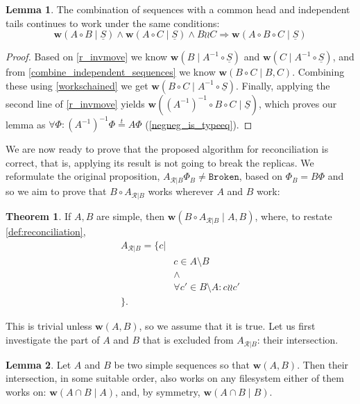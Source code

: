 \documentclass[12pt]{article}
\newcommand{\fsbroken}{\mathtt{Broken}} %
\newcommand{\FS}{\Phi} %
\newcommand{\cc}{\circ} %
\newcommand{\indep}{\mathrel{\wr\wr}} %
\newcommand{\workssign}{\mathbf{w}}
\newcommand{\works}[1]{\workssign({#1})}
\newcommand{\worksc}[2]{\workssign({#1}\mathrel{|}{#2})}
\newcommand{\typeeq}{\stackrel{t}{=}}
\newcommand{\seqset}[1]{\underline{#1}} %
\newcommand{\recchar}[3]{{#1}^{#3}_{\mathcal{R}|{#2}}}
\newcommand{\reca}{\recchar{A}{B}{}} %
\theoremstyle{definition}
\newtheorem{mydef}{Definition}
\newtheorem{mylem}{Lemma}
\newtheorem{myth}{Theorem}
\begin{document}
\begin{mylem}\label{indep_prefix_combine}
The combination of sequences with a common head and independent tails continues to work under the same conditions:
\[ \worksc{A\cc B}{\seqset{S}} \wedge \worksc{A\cc C}{\seqset{S}} \wedge B\indep C \Rightarrow \worksc{A\cc B\cc C}{\seqset{S}} \]
\end{mylem}
\begin{proof}
Based on \cref{r_invmove} we know
$\worksc{B}{A^{-1}\cc \seqset{S}}$ and $\worksc{C}{A^{-1}\cc \seqset{S}}$,
and from \cref{combine_independent_sequences} we know
$\worksc{B\cc C}{B,C}$.
Combining these using \cref{workschained}
we get
$\worksc{B\cc C}{A^{-1}\cc \seqset{S}}$. 
Finally, applying the second line of \cref{r_invmove} yields
$\worksc{(A^{-1})^{-1}\cc B\cc C}{\seqset{S}}$, which proves our lemma 
as $\forall\FS: (A^{-1})^{-1}\FS\typeeq A\FS$ (\cref{negneg_is_typeeq}).
\end{proof}


\medskip


We are now ready to prove that the proposed algorithm for reconciliation is correct,
that is, applying its result is not going to break the replicas.
We reformulate the original proposition, $\reca\FS_B\neq\fsbroken$,
based on $\FS_B=B\FS$ and so we aim to prove that
$B\cc\reca$ works wherever $A$ and $B$ work:

\begin{myth}
If $A, B$ are simple, then $\worksc{B\cc \reca}{A,B}$,
where, to restate \cref{def:reconciliation},
\begin{align*}
\reca = \{c| & \\
& c\in A\setminus B \\
& \wedge \\
& \forall c'\in B\setminus A: c\indep c'\\
\}. &
\end{align*}
\end{myth}

This is trivial unless $\works{A,B}$, so we assume that it is true.
Let us first investigate the part of $A$ and $B$ that is excluded from
$\reca$: their intersection.

\begin{mylem}\label{can_move_intersection}
Let $A$ and $B$ be two simple sequences so that $\works{A, B}$.
Then their intersection, in some suitable order, also works on any filesystem
either of them works on:
$\worksc{A\cap B}{A}$, and, by symmetry,
$\worksc{A\cap B}{B}$.
\end{mylem}
\end{document}
